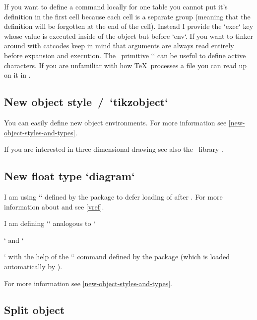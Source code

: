 If you want to define a command locally for one table you cannot put it's definition in the first cell because each cell is a separate group
(meaning that the definition will be forgotten at the end of the cell).
Instead I provide the `exec` key whose value is executed inside of the object but before `env`.
If you want to tinker around with catcodes keep in mind that arguments are always read entirely before expansion and execution.
The \eTeX\ primitive `\scantokens` can be useful to define active characters.
If you are unfamiliar with how \TeX\ processes a file you can read up on it in .



\subsection{New object style~\slash\ `tikzobject`}
\label{new-object-style-tikzobject}

You can easily define new object environments.
For more information see \cref{new-object-styles-and-types}.


If you are interested in three dimensional drawing see also the \TikZ\ library  \autocite[section~63 Three Point Perspective Drawing Library]{tikz}.


\subsection{New float type `diagram`}
\label{exp:new-object-type}

I am using `\AtEndPreamble` defined by the  package to defer loading of  after .
For more information about  and  see \cref{vref}.

I am defining `\listofdiagrams` analogous to `\listoffigures` and `\listoftables` with the help of the `\listof` command defined by the  package (which is loaded automatically by ).

For more information see \cref{new-object-styles-and-types}.



\subsection{Split object}
\label{split-object-example}

